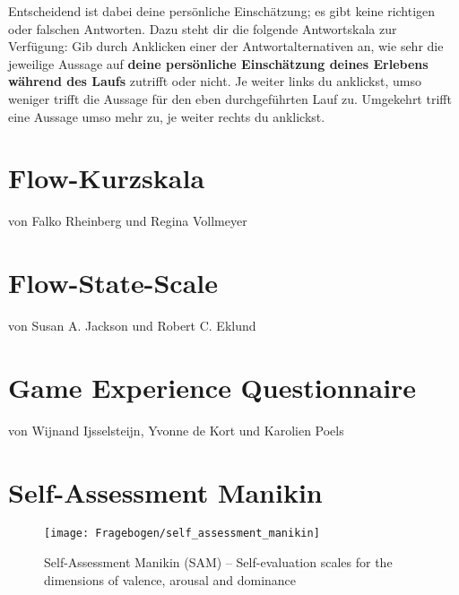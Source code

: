 Entscheidend ist dabei deine persönliche Einschätzung; es gibt keine richtigen oder falschen Antworten. Dazu steht dir die folgende Antwortskala zur Verfügung: Gib durch Anklicken einer der Antwortalternativen an, wie sehr die jeweilige Aussage auf \textbf{deine persönliche Einschätzung deines Erlebens während des Laufs} zutrifft oder nicht. Je weiter links du anklickst, umso weniger trifft die Aussage für den eben durchgeführten Lauf zu. Umgekehrt trifft eine Aussage umso mehr zu, je weiter rechts du anklickst. 
\newpage

\section{Flow-Kurzskala} 

\label{sec:flow_kurzskala} 

von Falko Rheinberg und Regina Vollmeyer

 

\section{Flow-State-Scale} 

\label{sec:flow_state_scale} 

von Susan A. Jackson und Robert C. Eklund 



\section{Game Experience Questionnaire} 

\label{sec:game_experience_questionnaire} 

von Wijnand Ijsselsteijn, Yvonne de Kort und Karolien Poels 



\section{Self-Assessment Manikin} 

\label{sec:self_assessment_manikin} 
\begin{figure}
	[!htb] \centering 
	\texttt{[image: Fragebogen/self\_assessment\_manikin]} \caption[Self-Assessment Manikin (SAM)]{Self-Assessment Manikin (SAM) -- Self-evaluation scales for the dimensions of valence, arousal and dominance \citep{Bradley1994}} \label{fig:self_assessment_manikin} 
\end{figure}

